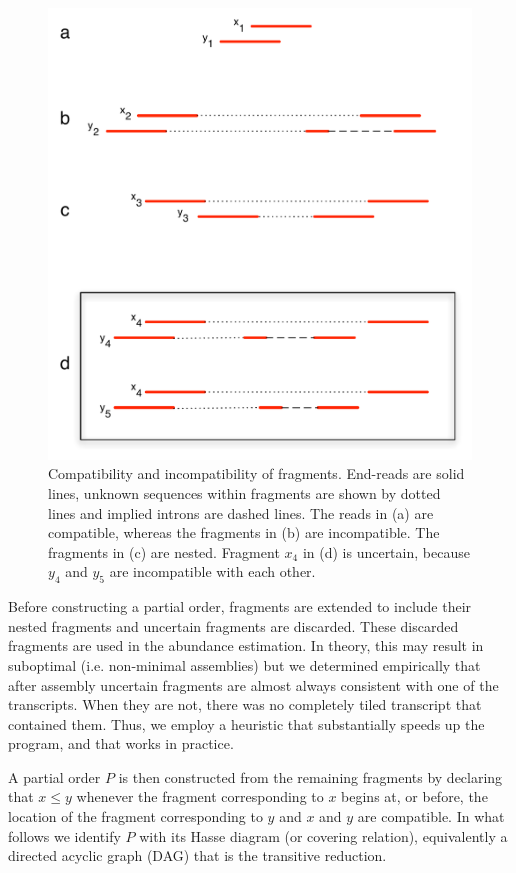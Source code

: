 \documentclass[12pt]{amsart}
\theoremstyle{definition}
\begin{document}
\begin{figure}[h] 
    \includegraphics[scale=0.5]{pdfs/compatibility.pdf}
    \caption[Compatibility and incompatibility of
    fragments]{Compatibility and incompatibility of
      fragments. End-reads are solid lines, unknown sequences within
      fragments are shown by dotted lines and implied introns are
      dashed lines. The reads in (a) are compatible, whereas the
      fragments in (b) are incompatible. The fragments in (c) are
      nested. Fragment $x_4$ in (d) is uncertain, because $y_4$ and
      $y_5$ are incompatible with each other.}
\end{figure}

Before constructing a partial order, fragments are extended to include
their nested fragments and uncertain fragments are discarded. These discarded fragments
are used in the abundance estimation. In theory, this may result in
suboptimal (i.e. non-minimal assemblies) but we determined empirically
that after assembly uncertain fragments are almost always consistent
with one of the transcripts. When they are not, there was no
completely tiled transcript that contained them. Thus, we employ a
heuristic that substantially speeds up the program, and that works
in practice.

A partial order $P$ is then constructed from the remaining fragments
by declaring that $x \leq y$ whenever the fragment corresponding to
$x$ begins at, or before, the location of the fragment corresponding
to $y$ and $x$ and $y$ are compatible. In what follows we identify $P$
with its Hasse diagram (or covering relation), equivalently a directed
acyclic graph (DAG) that is the transitive reduction. 
\end{document}
